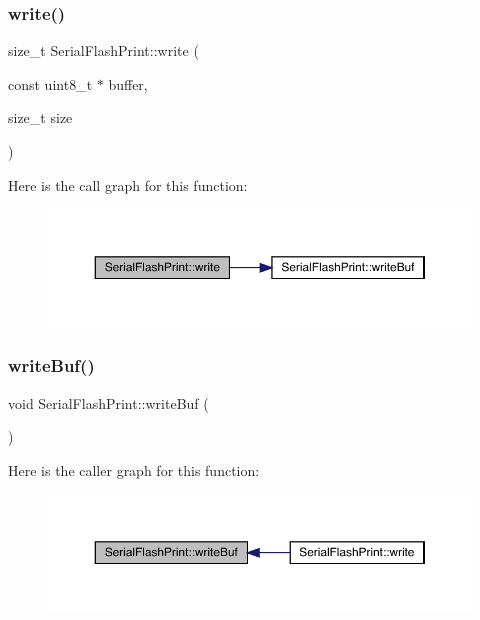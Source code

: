 \subsubsection{\texorpdfstring{write()}{write()}\hspace{0.1cm}{\footnotesize\ttfamily [2/2]}}
{\footnotesize\ttfamily size\+\_\+t Serial\+Flash\+Print\+::write (\begin{DoxyParamCaption}\item[{const uint8\+\_\+t $\ast$}]{buffer,  }\item[{size\+\_\+t}]{size }\end{DoxyParamCaption})\hspace{0.3cm}{\ttfamily [virtual]}}

Here is the call graph for this function\+:
\nopagebreak
\begin{figure}[H]
\begin{center}
\leavevmode
\includegraphics[width=350pt]{class_serial_flash_print_af814e70a1869c2b418351acdb7ebecc7_cgraph}
\end{center}
\end{figure}
\mbox{\label{class_serial_flash_print_aa3bc4b5315d97d3a2fb81391a9b83088}} 
\subsubsection{\texorpdfstring{write\+Buf()}{writeBuf()}}
{\footnotesize\ttfamily void Serial\+Flash\+Print\+::write\+Buf (\begin{DoxyParamCaption}{ }\end{DoxyParamCaption})}

Here is the caller graph for this function\+:
\nopagebreak
\begin{figure}[H]
\begin{center}
\leavevmode
\includegraphics[width=350pt]{class_serial_flash_print_aa3bc4b5315d97d3a2fb81391a9b83088_icgraph}
\end{center}
\end{figure}
\mbox{\label{class_serial_flash_print_a10d8aba39135e5b1cf6251961a87186f}} 
